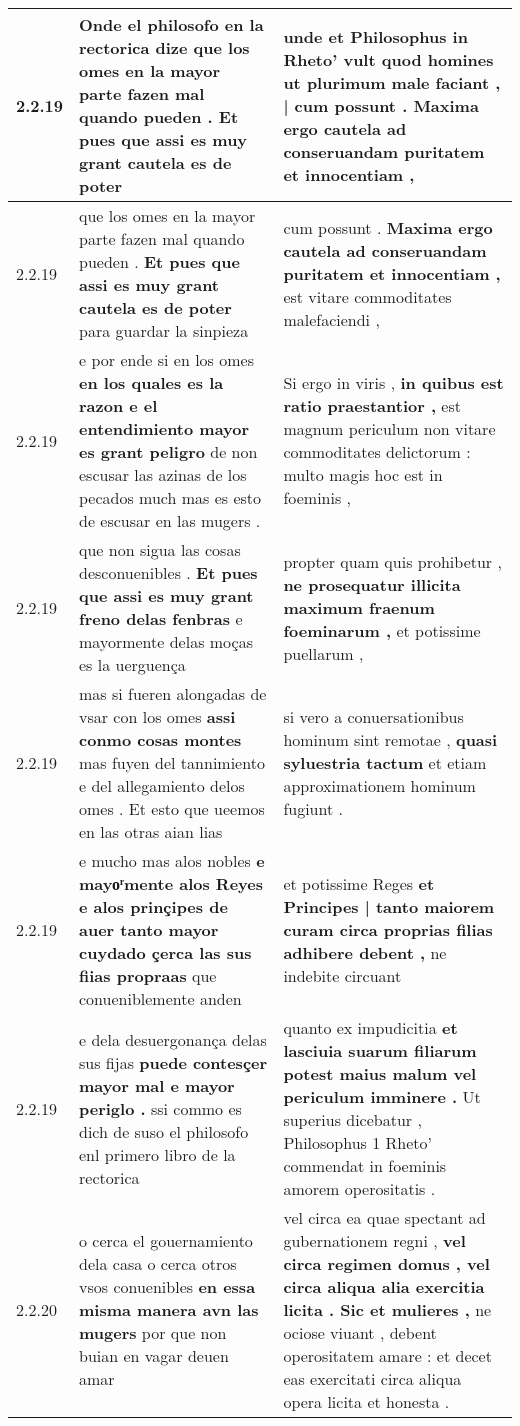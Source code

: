 \begin{tabular}{|p{1cm}|p{6.5cm}|p{6.5cm}|}
2.2.19 & Onde el philosofo en la rectorica dize \textbf{ que los omes en la mayor parte fazen mal quando pueden . } Et pues que assi es muy grant cautela es de poter & unde et Philosophus in Rheto’ vult quod homines \textbf{ ut plurimum male faciant , | cum possunt . } Maxima ergo cautela ad conseruandam puritatem et innocentiam , \\\hline
2.2.19 & que los omes en la mayor parte fazen mal quando pueden . \textbf{ Et pues que assi es muy grant cautela es de poter } para guardar la sinpieza & cum possunt . \textbf{ Maxima ergo cautela ad conseruandam puritatem et innocentiam , } est vitare commoditates malefaciendi , \\\hline
2.2.19 & e por ende si en los omes \textbf{ en los quales es la razon e el entendimiento mayor es grant peligro } de non escusar las azinas de los pecados much mas es esto de escusar en las mugers . & Si ergo in viris , \textbf{ in quibus est ratio praestantior , } est magnum periculum non vitare commoditates delictorum : multo magis hoc est in foeminis , \\\hline
2.2.19 & que non sigua las cosas desconuenibles . \textbf{ Et pues que assi es muy grant freno delas fenbras } e mayormente delas moças es la uerguença & propter quam quis prohibetur , \textbf{ ne prosequatur illicita maximum fraenum foeminarum , } et potissime puellarum , \\\hline
2.2.19 & mas si fueren alongadas de vsar con los omes \textbf{ assi conmo cosas montes } mas fuyen del tannimiento e del allegamiento delos omes . Et esto que ueemos en las otras aian lias & si vero a conuersationibus hominum sint remotae , \textbf{ quasi syluestria tactum } et etiam approximationem hominum fugiunt . \\\hline
2.2.19 & e mucho mas alos nobles \textbf{ e mayoͬmente alos Reyes e alos prinçipes de auer tanto mayor cuydado çerca las sus fiias propraas } que conueniblemente anden & et potissime Reges \textbf{ et Principes | tanto maiorem curam circa proprias filias adhibere debent , } ne indebite circuant \\\hline
2.2.19 & e dela desuergonança delas sus fijas \textbf{ puede contesçer mayor mal e mayor periglo . } ssi commo es dich de suso el philosofo enl primero libro de la rectorica & quanto ex impudicitia \textbf{ et lasciuia suarum filiarum potest maius malum vel periculum imminere . } Ut superius dicebatur , Philosophus 1 Rheto’ commendat in foeminis amorem operositatis . \\\hline
2.2.20 & o cerca el gouernamiento dela casa o cerca otros vsos conuenibles \textbf{ en essa misma manera avn las mugers } por que non buian en vagar deuen amar & vel circa ea quae spectant ad gubernationem regni , \textbf{ vel circa regimen domus , vel circa aliqua alia exercitia licita . Sic et mulieres , } ne ociose viuant , debent operositatem amare : et decet eas exercitati circa aliqua opera licita et honesta . \\\hline

\end{tabular}
